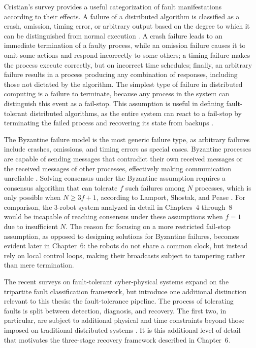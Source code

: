 Cristian's survey provides a useful categorization of fault manifestations according to their effects. A failure of a distributed algorithm is classified as a crash, omission, timing error, or arbitrary output based on the degree to which it can be distinguished from normal execution \cite{cristian1991understanding}. A crash failure leads to an immediate termination of a faulty process, while an omission failure causes it to omit some actions and respond incorrectly to some others; a timing failure makes the process execute correctly, but on incorrect time schedules; finally, an arbitrary failure results in a process producing any combination of responses, including those not dictated by the algorithm. The simplest type of failure in distributed computing is a failure to terminate, because any process in the system can distinguish this event as a fail-stop. This assumption is useful in defining fault-tolerant distributed algorithms, as the entire system can react to a fail-stop by terminating the failed process and recovering its state from backups \cite{cristian1991understanding}.

The Byzantine failure model is the most generic failure type, as arbitrary failures include crashes, omissions, and timing errors as special cases. Byzantine processes are capable of sending messages that contradict their own received messages or the received messages of other processes, effectively making communication unreliable \cite{lamport1982byzantine}. Solving consensus under the Byzantine assumption requires a consensus algorithm that can tolerate $f$ such failures among $N$ processes, which is only possible when $N \geq 3f + 1$, according to Lamport, Shostak, and Pease \cite{lamport1982byzantine}. For comparison, the 3-robot system analyzed in detail in Chapters~4 through~8 would be incapable of reaching consensus under these assumptions when $f = 1$ due to insufficient $N$. The reason for focusing on a more restricted fail-stop assumption, as opposed to designing solutions for Byzantine failures, becomes evident later in Chapter~6: the robots do not share a common clock, but instead rely on local control loops, making their broadcasts subject to tampering rather than mere termination.

The recent surveys on fault-tolerant cyber-physical systems expand on the tripartite fault classification framework, but introduce one additional distinction relevant to this thesis: the fault-tolerance pipeline. The process of tolerating faults is split between detection, diagnosis, and recovery. The first two, in particular, are subject to additional physical and time constraints beyond those imposed on traditional distributed systems \cite{piardi2020faulttolerance}. It is this additional level of detail that motivates the three-stage recovery framework described in Chapter~6.

